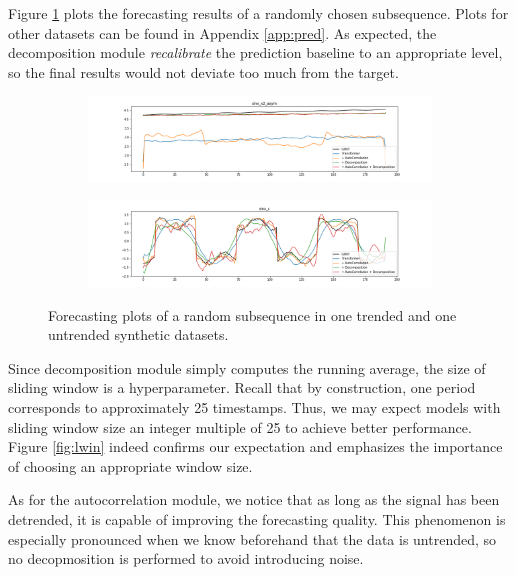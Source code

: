 Figure \ref{fig:synth_pred} plots the forecasting results of a randomly chosen subsequence. 
Plots for other datasets can be found in Appendix \ref{app:pred}. 
As expected, the decomposition module \textit{recalibrate} the prediction baseline to an appropriate level, so the final results would not deviate too much from the target. 

\begin{figure}
    \centering
    \begin{subfigure}{0.9\textwidth}
        \includegraphics[width=\textwidth]{img/pred_sinx_x2_asym.png}
    \end{subfigure}
    \begin{subfigure}{0.9\textwidth}
        \includegraphics[width=\textwidth]{img/pred_sinx_c.png}
    \end{subfigure}
    \caption{Forecasting plots of a random subsequence in one trended and one untrended synthetic datasets.}
    \label{fig:synth_pred}
\end{figure}

Since decomposition module simply computes the running average, the size of sliding window is a hyperparameter. 
Recall that by construction, one period corresponds to approximately 25 timestamps. 
Thus, we may expect models with sliding window size an integer multiple of 25 to achieve better performance. 
Figure \ref{fig:lwin} indeed confirms our expectation and emphasizes the importance of choosing an appropriate window size. 

As for the autocorrelation module, we notice that as long as the signal has been detrended, it is capable of improving the forecasting quality. 
This phenomenon is especially pronounced when we know beforehand that the data is untrended, so no decopmosition is performed to avoid introducing noise. 

